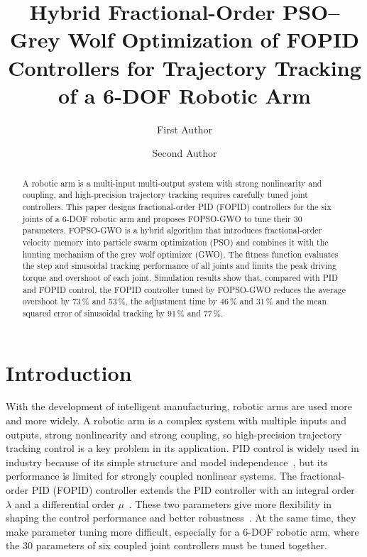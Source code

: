 \documentclass{svproc}
\begin{document}
\mainmatter

\title{Hybrid Fractional-Order PSO--Grey Wolf Optimization of FOPID Controllers for
Trajectory Tracking of a 6-DOF Robotic Arm}

\author{First Author \and Second Author}

\maketitle

\begin{abstract}
A robotic arm is a multi-input multi-output system with strong nonlinearity and coupling,
and high-precision trajectory tracking requires carefully tuned joint controllers. This
paper designs fractional-order PID (FOPID) controllers for the six joints of a 6-DOF
robotic arm and proposes FOPSO-GWO to tune their 30 parameters. FOPSO-GWO is a hybrid
algorithm that introduces fractional-order velocity memory into particle swarm optimization
(PSO) and combines it with the hunting mechanism of the grey wolf optimizer (GWO). The
fitness function evaluates the step and sinusoidal tracking performance of all joints and
limits the peak driving torque and overshoot of each joint. Simulation results show that,
compared with PID and FOPID control, the FOPID controller tuned by FOPSO-GWO reduces the
average overshoot by 73\,\% and 53\,\%, the adjustment time by 46\,\% and 31\,\% and the
mean squared error of sinusoidal tracking by 91\,\% and 77\,\%.
\end{abstract}

\section{Introduction}

With the development of intelligent manufacturing, robotic arms are used more and more
widely. A robotic arm is a complex system with multiple inputs and outputs, strong
nonlinearity and strong coupling, so high-precision trajectory tracking control is a key
problem in its application. PID control is widely used in industry because of its simple
structure and model independence~\cite{borase2021}, but its performance is limited for
strongly coupled nonlinear systems. The fractional-order PID (FOPID) controller extends the
PID controller with an integral order $\lambda$ and a differential order
$\mu$~\cite{podlubny1999}. These two parameters give more flexibility in shaping the control
performance and better robustness~\cite{monje2010,shah2016,tepljakov2021}. At the same time,
they make parameter tuning more difficult, especially for a 6-DOF robotic arm, where the 30
parameters of six coupled joint controllers must be tuned together.
\end{document}
